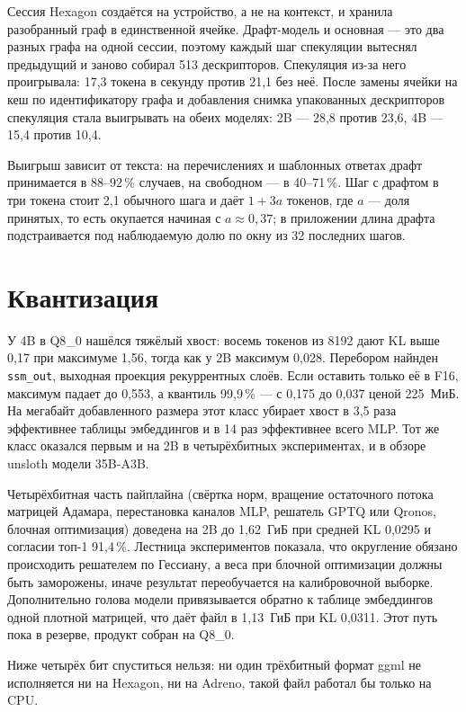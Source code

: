 \documentclass[11pt]{article}
\begin{document}
Сессия Hexagon создаётся на устройство, а не на контекст, и хранила разобранный граф
в единственной ячейке. Драфт-модель и основная --- это два разных графа на
одной сессии, поэтому каждый шаг спекуляции вытеснял предыдущий и заново
собирал 513 дескрипторов. Спекуляция из-за него проигрывала: 17{,}3 токена в секунду
против 21{,}1 без неё. После замены ячейки на кеш по идентификатору графа и
добавления снимка упакованных дескрипторов спекуляция стала выигрывать на
обеих моделях: 2B --- 28{,}8 против 23{,}6, 4B --- 15{,}4 против 10{,}4.

Выигрыш зависит от текста: на перечислениях и шаблонных ответах драфт
принимается в 88--92\,\% случаев, на свободном --- в 40--71\,\%. Шаг с драфтом
в три токена стоит 2{,}1 обычного шага и даёт $1+3a$ токенов, где $a$ --- доля
принятых, то есть окупается начиная с $a\approx0{,}37$; в приложении длина
драфта подстраивается под наблюдаемую долю по окну из 32 последних шагов.


\section{Квантизация}

У 4B в Q8\_0 нашёлся тяжёлый хвост: восемь токенов из 8192 дают KL выше
0{,}17 при максимуме 1{,}56, тогда как у 2B максимум 0{,}028. Перебором найнден \texttt{ssm\_out}, выходная проекция
рекуррентных слоёв. Если оставить только её в F16, максимум падает до
0{,}553, а квантиль 99{,}9\,\% --- с 0{,}175 до 0{,}037 ценой 225~МиБ. На
мегабайт добавленного размера этот класс убирает хвост в 3{,}5 раза
эффективнее таблицы эмбеддингов и в 14 раз эффективнее всего MLP. Тот же класс
оказался первым и на 2B в четырёхбитных экспериментах, и в обзоре unsloth
модели 35B-A3B.

Четырёхбитная часть пайплайна (свёртка норм, вращение остаточного потока
матрицей Адамара, перестановка каналов MLP, решатель GPTQ или Qronos, блочная
оптимизация) доведена на 2B до 1{,}62~ГиБ при средней KL 0{,}0295 и согласии
топ-1 91{,}4\,\%. Лестница экспериментов показала, что округление обязано
происходить решателем по Гессиану, а веса при блочной оптимизации должны быть
заморожены, иначе результат переобучается на калибровочной выборке.
Дополнительно голова модели привязывается обратно к таблице эмбеддингов одной
плотной матрицей, что даёт файл в 1{,}13~ГиБ при KL 0{,}0311. Этот путь пока в
резерве, продукт собран на Q8\_0.

Ниже четырёх бит спуститься нельзя: ни один трёхбитный формат ggml не
исполняется ни на Hexagon, ни на Adreno, такой файл работал бы только на CPU.
\end{document}
